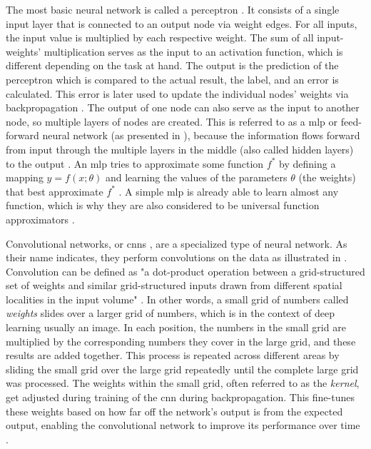 The most basic neural network is called a perceptron  \cite{rosenblatt1958PerceptronProbabilisticModel}.
It consists of a single input layer that is connected to an output node via weight edges.
For all inputs, the input value is multiplied by each respective weight.
The sum of all input-weights' multiplication serves as the input to an activation function, which is different depending on the task at hand.
The output is the prediction of the perceptron which is compared to the actual result, the label, and an error is calculated.
This error is later used to update the individual nodes' weights via backpropagation \cite{aggarwal2018NeuralNetworksDeep}.
The output of one node can also serve as the input to another node, so multiple layers of nodes are created.
This is referred to as a \gls{mlp} or feed-forward neural network (as presented in ), 
because the information flows forward from input through the multiple layers in the middle (also called hidden layers) to the output \cite{aggarwal2018NeuralNetworksDeep, Goodfellow-et-al-2016}.
An \gls{mlp} tries to approximate some function $f^*$ by defining a mapping $y=f(x;\theta)$ and learning the values of the parameters $\theta$ (\ie the weights) that best approximate $f^*$ \cite{Goodfellow-et-al-2016}.
A simple \gls{mlp} is already able to learn almost any function, which is why they are also considered to be universal function approximators \cite{aggarwal2018NeuralNetworksDeep, hornik1989MultilayerFeedforwardNetworks}.

Convolutional networks, or \glspl{cnn} \cite{lecun1998GradientbasedLearningApplied}, are a specialized type of neural network.
As their name indicates, they perform convolutions on the data as illustrated in .
Convolution can be defined as "a dot-product operation between a grid-structured set of weights and similar grid-structured inputs drawn from
different spatial localities in the input volume" \cite[p. 316]{aggarwal2018NeuralNetworksDeep}.
In other words, a small grid of numbers called \textit{weights} slides over a larger grid of numbers, which is in the context of deep learning usually an image.
In each position, the numbers in the small grid are multiplied by the corresponding numbers they cover in the large grid, and these results are added together. 
This process is repeated across different areas by sliding the small grid over the large grid repeatedly until the complete large grid was processed.
The weights within the small grid, often referred to as the \textit{kernel}, get adjusted during training of the \gls{cnn} during backpropagation. 
This fine-tunes these weights based on how far off the network's output is from the expected output, enabling the convolutional network to improve its performance over time \cite{aggarwal2018NeuralNetworksDeep, Goodfellow-et-al-2016}.

